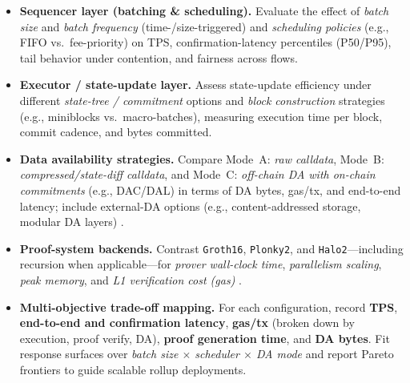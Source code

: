 \begin{itemize}
  \item \textbf{Sequencer layer (batching \& scheduling).}
  Evaluate the effect of \emph{batch size} and \emph{batch frequency} (time-/size-triggered) and \emph{scheduling policies} (e.g., FIFO vs.\ fee-priority) on
  TPS, confirmation-latency percentiles (P50/P95), tail behavior under contention, and fairness across flows.

  \item \textbf{Executor / state-update layer.}
  Assess state-update efficiency under different \emph{state-tree / commitment} options and \emph{block construction} strategies (e.g., miniblocks vs.\ macro-batches), measuring execution time per block, commit cadence, and bytes committed.

  \item \textbf{Data availability strategies.}
  Compare Mode~A: \emph{raw calldata}, Mode~B: \emph{compressed/state-diff calldata}, and Mode~C: \emph{off-chain DA with on-chain commitments} (e.g., DAC/DAL) in terms of DA bytes, gas/tx, and end-to-end latency; include external-DA options (e.g., content-addressed storage, modular DA layers) \cite{protocol_ipfs,celestia_how}.

  \item \textbf{Proof-system backends.}
  Contrast \texttt{Groth16}, \texttt{Plonky2}, and \texttt{Halo2}—including recursion when applicable—for \emph{prover wall-clock time}, \emph{parallelism scaling}, \emph{peak memory}, and \emph{L1 verification cost (gas)} \cite{iden3_circom,sui_groth16,polygon_plonky2,zcash_halo2}.

  \item \textbf{Multi-objective trade-off mapping.}
  For each configuration, record \textbf{TPS}, \textbf{end-to-end and confirmation latency}, \textbf{gas/tx} (broken down by execution, proof verify, DA), \textbf{proof generation time}, and \textbf{DA bytes}. Fit response surfaces over \emph{batch size $\times$ scheduler $\times$ DA mode} and report Pareto frontiers to guide scalable rollup deployments.
\end{itemize}


